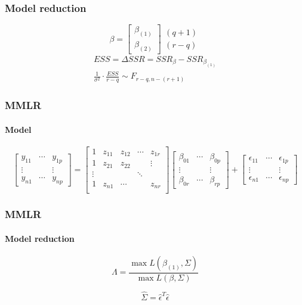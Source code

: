 \documentclass[aspectratio=169,10pt,t]{beamer}
\begin{document}
\begin{frame}[t]
	\frametitle{Model reduction}

	\[
	\beta
	=
	\begin{bmatrix}
		\beta_{ \left( 1 \right) }\\
		\beta_{ \left( 2 \right) }
	\end{bmatrix}
	\begin{matrix}
		\left( q+1 \right) \\
		\left( r-q \right) 
	\end{matrix}
	\] 
	\pause
	\[
		\begin{gathered}
		ESS = \Delta SSR =
		SSR_{\beta} 
		-
		SSR_{\beta_{ \left( 1 \right) }} \\
		\frac{1}{ \sigma^{2}} 
		\cdot
		\frac{ESS}{r-q} 
		\sim
		F_{r-q,n- \left( r+1 \right) }
		\end{gathered}
	\]

\end{frame}

\begin{frame}[t]
	\frametitle{MMLR}
	\framesubtitle{Model}

	 \[
		 \begin{bmatrix}
			 y_{11} & \cdots & y_{1p}\\
\vdots& &\vdots\\
			 y_{n1} & \cdots & y_{np}
		 \end{bmatrix}
		 = 
		\begin{bmatrix}
			1 & z_{11} & z_{12} & \cdots & z_{1r}\\
			1 & z_{21} & z_{22} &  & \vdots\\
			\vdots & & & \ddots & \\
			1 & z_{n1} &   \cdots && z_{nr}\\
		\end{bmatrix}
		\begin{bmatrix}
			\beta_{01} & \cdots & \beta_{0p}\\
			\vdots && \vdots\\
			\beta_{0r} & \cdots & \beta_{rp}
		\end{bmatrix}
		+
		\begin{bmatrix}
			\epsilon_{11} & \cdots & \epsilon_{1p}\\
			\vdots & & \vdots \\
			\epsilon_{n1} & \cdots & \epsilon_{np}
		\end{bmatrix}
	\] 

	
\end{frame}

\begin{frame}[t]
	\frametitle{MMLR}
	\framesubtitle{Model reduction}

	\[
	\Lambda =
	\frac{\max L \left( \beta_{ \left( 1 \right) }   , \Sigma \right) }
	{\max L  \left( \beta ,\Sigma  \right) } 
	\] 

	\pause

	\[
	\hat{\Sigma} = \hat{\epsilon}^{T} \hat{\epsilon}
	\] 


\end{frame}
\end{document}
